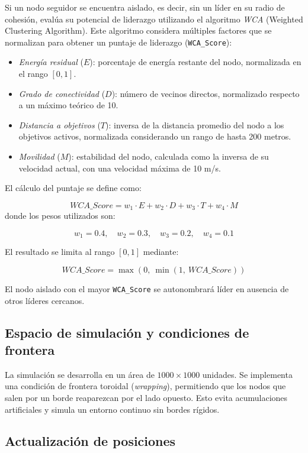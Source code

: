 \documentclass{article}
\begin{document}
Si un nodo seguidor se encuentra aislado, es decir, sin un líder en su radio de cohesión, evalúa su potencial de liderazgo utilizando el algoritmo \textit{WCA} (Weighted Clustering Algorithm). Este algoritmo considera múltiples factores que se normalizan para obtener un puntaje de liderazgo (\texttt{WCA\_Score}):

\begin{itemize}
    \item \textit{Energía residual} (\(E\)): porcentaje de energía restante del nodo, normalizada en el rango \([0,1]\).
    \item \textit{Grado de conectividad} (\(D\)): número de vecinos directos, normalizado respecto a un máximo teórico de 10.
    \item \textit{Distancia a objetivos} (\(T\)): inversa de la distancia promedio del nodo a los objetivos activos, normalizada considerando un rango de hasta 200 metros.
    \item \textit{Movilidad} (\(M\)): estabilidad del nodo, calculada como la inversa de su velocidad actual, con una velocidad máxima de 10 m/s.
\end{itemize}

El cálculo del puntaje se define como:

\[
{WCA\_Score} = w_1 \cdot E + w_2 \cdot D + w_3 \cdot T + w_4 \cdot M
\]
donde los pesos utilizados son:

\[
w_1 = 0.4, \quad w_2 = 0.3, \quad w_3 = 0.2, \quad w_4 = 0.1
\]

El resultado se limita al rango \([0, 1]\) mediante:

\[
{WCA\_Score} = \max\left(0,\ \min\left(1,\ {WCA\_Score}\right)\right)
\]

El nodo aislado con el mayor \texttt{WCA\_Score} se autonombrará líder en ausencia de otros líderes cercanos.

\subsection{Espacio de simulación y condiciones de frontera}

La simulación se desarrolla en un área de $1000 \times 1000$ unidades. Se implementa una condición de frontera toroidal (\textit{wrapping}), permitiendo que los nodos que salen por un borde reaparezcan por el lado opuesto. Esto evita acumulaciones artificiales y simula un entorno continuo sin bordes rígidos.

\subsection{Actualización de posiciones}
\end{document}
